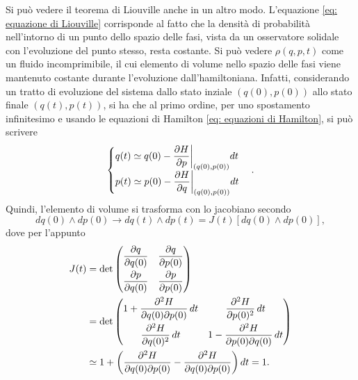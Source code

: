 \begin{obs}
    Si può vedere il teorema di Liouville anche in un altro modo. L'equazione \eqref{eq: equazione di Liouville} corrisponde al fatto che la densità di probabilità nell'intorno di un punto dello spazio delle fasi, vista da un osservatore solidale con l'evoluzione del punto stesso, resta costante. Si può vedere $\rho(q,p,t)$ come un fluido incomprimibile, il cui elemento di volume nello spazio delle fasi viene mantenuto costante durante l'evoluzione dall'hamiltoniana. Infatti, considerando un tratto di evoluzione del sistema dallo stato inziale $(q(0),p(0))$ allo stato finale $(q(t),p(t))$, si ha che al primo ordine, per uno spostamento infinitesimo e usando le equazioni di Hamilton \eqref{eq: equazioni di Hamilton}, si può scrivere
    \begin{equation}
        \begin{cases}
            q(t) \simeq q(0) - \dfrac{\partial H}{\partial p}\bigg|_{(q(0),p(0))}dt \\
            p(t) \simeq p(0) - \dfrac{\partial H}{\partial q}\bigg|_{(q(0),p(0))}dt
        \end{cases}.
    \end{equation}
    Quindi, l'elemento di volume si trasforma con lo jacobiano secondo
    \begin{equation}
        dq(0) \wedge dp(0) \to dq(t) \wedge dp(t) = J(t)[dq(0) \wedge dp(0)],
    \end{equation}
    dove per l'appunto 
    \begin{equation}
        \begin{split}
            J(t) &= \det{
            \begin{pmatrix}
                \dfrac{\partial q}{\partial q(0)} & \dfrac{\partial q}{\partial p(0)} \\[2ex]
                \dfrac{\partial p}{\partial q(0)} & \dfrac{\partial p}{\partial p(0)}
            \end{pmatrix}} \\
            &= \det{
            \begin{pmatrix}
                1 + \dfrac{\partial^2 H}{\partial q(0)\partial p(0)}\,dt & \dfrac{\partial^2 H}{\partial p(0)^2}\,dt \\[2ex]
                \dfrac{\partial^2 H}{\partial q(0)^2}\,dt & 1 - \dfrac{\partial^2 H}{\partial p(0)\partial q(0)}\,dt
            \end{pmatrix}} \\
            &\simeq 1 + \bigg(\dfrac{\partial^2 H}{\partial q(0)\partial p(0)} - \dfrac{\partial^2 H}{\partial q(0)\partial p(0)}\bigg)\,dt = 1.
        \end{split}
    \end{equation}
\end{obs}
